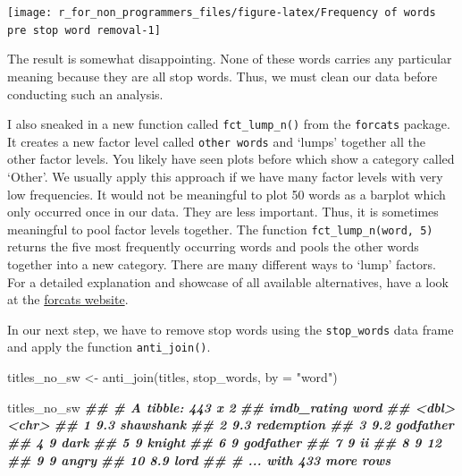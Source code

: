 \documentclass[
]{book}
\newenvironment{Shaded}{\begin{snugshade}}{\end{snugshade}}
\newcommand{\AttributeTok}[1]{\textcolor[rgb]{0.77,0.63,0.00}{#1}}
\newcommand{\DocumentationTok}[1]{\textcolor[rgb]{0.56,0.35,0.01}{\textbf{\textit{#1}}}}
\newcommand{\FunctionTok}[1]{\textcolor[rgb]{0.00,0.00,0.00}{#1}}
\newcommand{\NormalTok}[1]{#1}
\newcommand{\OtherTok}[1]{\textcolor[rgb]{0.56,0.35,0.01}{#1}}
\newcommand{\StringTok}[1]{\textcolor[rgb]{0.31,0.60,0.02}{#1}}
\begin{document}
\begin{center}\texttt{[image: r\_for\_non\_programmers\_files/figure-latex/Frequency of words pre stop word removal-1]} \end{center}

The result is somewhat disappointing. None of these words carries any particular meaning because they are all stop words. Thus, we must clean our data before conducting such an analysis.

I also sneaked in a new function called \texttt{fct\_lump\_n()} from the \texttt{forcats} package. It creates a new factor level called \texttt{other\ words} and `lumps' together all the other factor levels. You likely have seen plots before which show a category called `Other'. We usually apply this approach if we have many factor levels with very low frequencies. It would not be meaningful to plot 50 words as a barplot which only occurred once in our data. They are less important. Thus, it is sometimes meaningful to pool factor levels together. The function \texttt{fct\_lump\_n(word,\ 5)} returns the five most frequently occurring words and pools the other words together into a new category. There are many different ways to `lump' factors. For a detailed explanation and showcase of all available alternatives, have a look at the \href{https://forcats.tidyverse.org/reference/fct_lump.html}{forcats website}.

In our next step, we have to remove stop words using the \texttt{stop\_words} data frame and apply the function \texttt{anti\_join()}.

\begin{Shaded}
\begin{Highlighting}[]
\NormalTok{titles\_no\_sw }\OtherTok{\textless{}{-}} \FunctionTok{anti\_join}\NormalTok{(titles, stop\_words,}
                          \AttributeTok{by =} \StringTok{"word"}\NormalTok{)}

\NormalTok{titles\_no\_sw}
\DocumentationTok{\#\# \# A tibble: 443 x 2}
\DocumentationTok{\#\#    imdb\_rating word      }
\DocumentationTok{\#\#          \textless{}dbl\textgreater{} \textless{}chr\textgreater{}     }
\DocumentationTok{\#\#  1         9.3 shawshank }
\DocumentationTok{\#\#  2         9.3 redemption}
\DocumentationTok{\#\#  3         9.2 godfather }
\DocumentationTok{\#\#  4         9   dark      }
\DocumentationTok{\#\#  5         9   knight    }
\DocumentationTok{\#\#  6         9   godfather }
\DocumentationTok{\#\#  7         9   ii        }
\DocumentationTok{\#\#  8         9   12        }
\DocumentationTok{\#\#  9         9   angry     }
\DocumentationTok{\#\# 10         8.9 lord      }
\DocumentationTok{\#\# \# ... with 433 more rows}
\end{Highlighting}
\end{Shaded}
\end{document}
